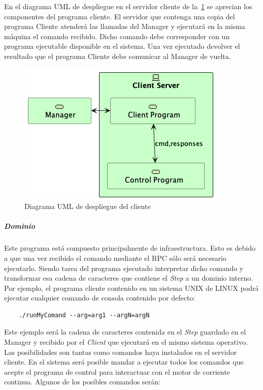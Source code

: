 
En el diagrama UML de despliegue en el servidor cliente de la~\cref{fig:Diagrama UML de despliegue del cliente} se aprecian los componentes del programa cliente.
El servidor que contenga una copia del programa Cliente atenderá las llamadas del Manager y ejecutará en la misma máquina el comando recibido.
Dicho comando debe corresponder con un programa ejecutable disponible en el sistema.
Una vez ejecutado devolver el resultado que el programa Cliente debe comunicar al Manager de vuelta.

\begin{figure}[H]
    \centering
    \includegraphics[height=0.2\textheight]{./part/Proyecto_ejecutivo/memoria_descriptiva/descripcionDelProyecto/client/uml/clientServerConcept}
    \caption{Diagrama UML de despliegue del cliente}\label{fig:Diagrama UML de despliegue del cliente}
\end{figure}

\subparagraph{Dominio}

Este programa está compuesto principalmente de infraestructura.
Esto es debido a que una vez recibido el comando mediante el RPC sólo será necesario ejecutarlo.
Siendo tarea del programa ejecutado interpretar dicho comando y transformar esa cadena de caracteres que contiene el \textit{Step} a un dominio interno.
Por ejemplo, el programa cliente contenido en un sistema UNIX de LINUX podrá ejecutar cualquier comando de consola contenido por defecto:

\begin{verbatim}
    ./runMyComand --arg=arg1 --argN=argN
\end{verbatim}

Este ejemplo será la cadena de caracteres contenida en el \textit{Step} guardado en el Manager y recibido por el \textit{Client} que ejecutará en el mismo sistema operativo.
Las posibilidades son tantas como comandos haya instalados en el servidor cliente.
En el sistema será posible mandar a ejecutar todos los comandos que acepte el programa de control para interactuar con el motor de corriente continua.
Algunos de los posibles comandos serán:

